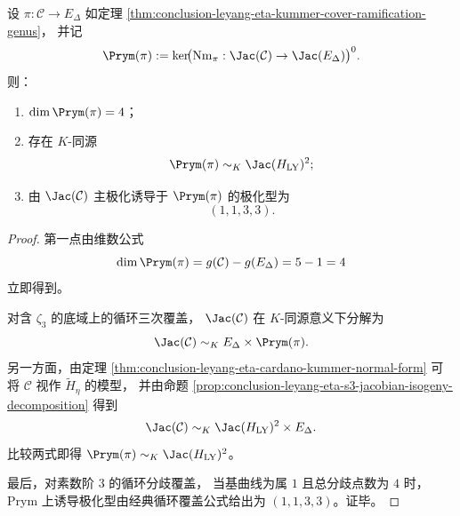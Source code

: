 \begin{theorem}\label{thm:conclusion-leyang-eta-prym-identification-polarization-type}
设 \(\pi:\mathcal C\to E_\Delta\) 如定理
\ref{thm:conclusion-leyang-eta-kummer-cover-ramification-genus}，
并记
\[
\Prym(\pi):=\ker\!\bigl(\operatorname{Nm}_\pi:\Jac(\mathcal C)\to \Jac(E_\Delta)\bigr)^0.
\]
则：
\begin{enumerate}
  \item \(\dim \Prym(\pi)=4\)；
  \item 存在 \(K\)-同源
  \[
  \Prym(\pi)\sim_K \Jac(H_{\mathrm{LY}})^2;
  \]
  \item 由 \(\Jac(\mathcal C)\) 主极化诱导于 \(\Prym(\pi)\) 的极化型为
  \[
  (1,1,3,3).
  \]
\end{enumerate}
\end{theorem}
\begin{proof}
第一点由维数公式
\[
\dim \Prym(\pi)=g(\mathcal C)-g(E_\Delta)=5-1=4
\]
立即得到。

对含 \(\zeta_3\) 的底域上的循环三次覆盖，
\(\Jac(\mathcal C)\) 在 \(K\)-同源意义下分解为
\[
\Jac(\mathcal C)\sim_K E_\Delta\times \Prym(\pi).
\]
另一方面，由定理
\ref{thm:conclusion-leyang-eta-cardano-kummer-normal-form}
可将 \(\mathcal C\) 视作 \(\widetilde H_\eta\) 的模型，
并由命题
\ref{prop:conclusion-leyang-eta-s3-jacobian-isogeny-decomposition}
得到
\[
\Jac(\mathcal C)\sim_K \Jac(H_{\mathrm{LY}})^2\times E_\Delta.
\]
比较两式即得
\(
\Prym(\pi)\sim_K\Jac(H_{\mathrm{LY}})^2
\)。

最后，对素数阶 \(3\) 的循环分歧覆盖，
当基曲线为属 \(1\) 且总分歧点数为 \(4\) 时，
Prym 上诱导极化型由经典循环覆盖公式给出为
\((1,1,3,3)\)。证毕。
\end{proof}

